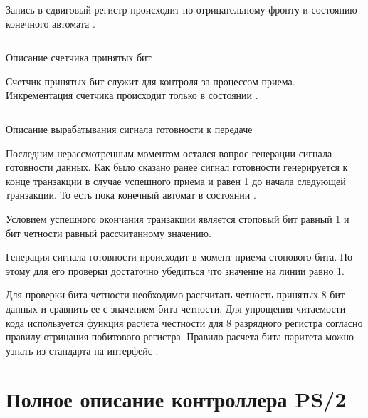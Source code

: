 \par{Запись в сдвиговый регистр происходит по отрицательному фронту  и состоянию конечного автомата .}

%

\begin{listing}[H]
	\inputminted{SystemVerilog}{code_examples/lab_6/count_bit.sv}
	\caption{Описание счетчика принятых бит}
\end{listing}


\par{Счетчик принятых бит служит для контроля за процессом приема. Инкрементация счетчика происходит только в состоянии .}

%

\begin{listing}[H]
	\inputminted{SystemVerilog}{code_examples/lab_6/parity.sv}
	\caption{Описание вырабатывания сигнала готовности к передаче}
\end{listing}

\par{Последним нерассмотренным моментом остался вопрос генерации сигнала готовности данных. Как было сказано ранее сигнал готовности генерируется к конце транзакции в случае успешного приема и равен 1 до начала следующей транзакции. То есть пока конечный автомат в состоянии .}

\par{Условием успешного окончания транзакции является стоповый бит равный 1 и бит четности равный рассчитанному значению.}

\par{Генерация сигнала готовности происходит в момент приема стопового бита. По этому для его проверки достаточно убедиться что значение на линии  равно 1.}

\par{Для проверки бита четности необходимо рассчитать четность принятых 8 бит данных и сравнить ее с значением бита четности. Для упрощения читаемости кода используется функция расчета честности для 8 разрядного регистра согласно правилу отрицания побитового  регистра. Правило расчета бита паритета можно узнать из стандарта на интерфейс .}

\section{Полное описание контроллера PS/2}

